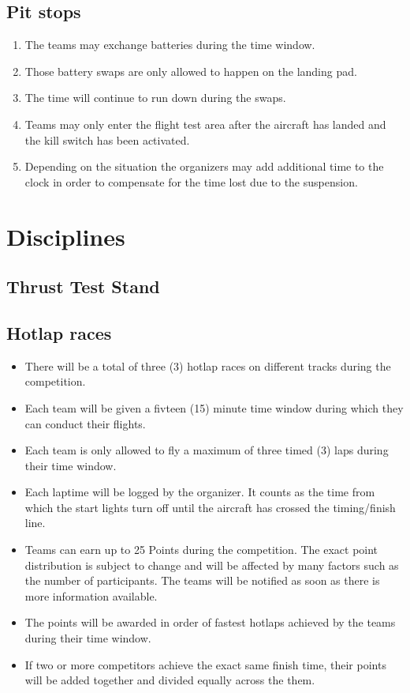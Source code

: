     \subsection{Pit stops}
    \begin{enumerate}
      \item The teams may exchange batteries during the time window. 
      \item Those battery swaps are only allowed to happen on the landing pad. 
      \item The time will continue to run down during the swaps. 
      \item Teams may only enter the flight test area after the aircraft has landed and the kill switch has been activated.  
      \item Depending on the situation the organizers may add additional time to the clock in order to compensate for the time lost due to the suspension. 
    \end{enumerate}

    
  
    


    \section{Disciplines}
    \subsection{Thrust Test Stand}
    \subsection{Hotlap races}
    \begin{itemize}
      \item There will be a total of three (3) hotlap races on different tracks during the competition. 
      \item Each team will be given a fivteen (15) minute time window during which they can conduct their flights. 
      \item Each team is only allowed to fly a maximum of three timed (3) laps during their time window. 
      \item Each laptime will be logged by the organizer. It counts as the time from which the start lights turn off until the aircraft has crossed the timing/finish line. 
      \item Teams can earn up to 25 Points during the competition. The exact point distribution is subject to change and will be affected by many factors such as the number of participants.
      The teams will be notified as soon as there is more information available.
      \item The points will be awarded in order of fastest hotlaps achieved by the teams during their time window.
      \item If two or more competitors achieve the exact same finish time, their points will be added together and divided equally across the them.  
    \end{itemize}



